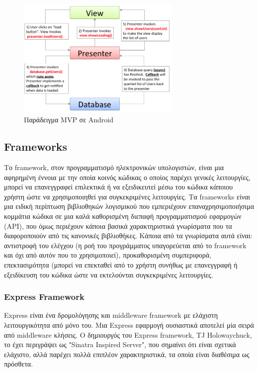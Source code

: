 	\begin{figure}[h]
	    \centering
	    \includegraphics[width=0.7\textwidth]{mvp_workflow.png}
	    \caption{Παράδειγμα MVP σε Android}
	    \label{fig:mvp_workflow}
	\end{figure}

	\subsection{Frameworks}
	
		Το framework, στον προγραμματισμό ηλεκτρονικών υπολογιστών, είναι μια αφηρημένη έννοια με την οποία κοινός κώδικας ο οποίος παρέχει γενικές λειτουργίες, μπορεί να επανεγγραφεί επιλεκτικά ή να εξειδικευτεί μέσω του κώδικα κάποιου χρήστη ώστε να χρησιμοποιηθεί για συγκεκριμένες λειτουργίες. Τα frameworks είναι μια ειδική περίπτωση βιβλιοθηκών λογισμικού που εμπεριέχουν επαναχρησιμοποιήσιμα κομμάτια κώδικα σε μια καλά καθορισμένη διεπαφή προγραμματισμού εφαρμογών (API), που όμως περιέχουν κάποια βασικά χαρακτηριστικά γνωρίσματα που τα διαφοροποιούν από τις κανονικές βιβλιοθήκες. Κάποια από τα γνωρίσματα αυτά είναι: αντιστροφή του ελέγχου (η ροή του προγράμματος υπαγορεύεται από το framework και όχι από αυτόν που το χρησιμοποιεί), προκαθορισμένη συμπεριφορά, επεκτασιμότητα (μπορεί να επεκταθεί από το χρήστη συνήθως με επανεγγραφή  ή εξειδίκευση του κώδικα ώστε να εκτελούνται συγκεκριμένες λειτουργίες. \cite{Framework}

	
		\subsubsection{Express Framework}


		Express είναι ένα δρομολόγησης και middleware framework με ελάχιστη λειτουργικότητα από μόνο του. Μια Express εφαρμογή ουσιαστικά αποτελεί μία σειρά από middleware κλήσεις. Ο δημιουργός του Express framework, TJ Holowaychuck, το έχει περιγράψει ως "Sinatra Inspired Server",  που σημαίνει ότι είναι σχετικά ελάχιστο, αλλά παρέχει πολλά επιπλέον χαρακτηριστικά, τα οποία είναι διαθέσιμα ως πρόσθετα. 
		
